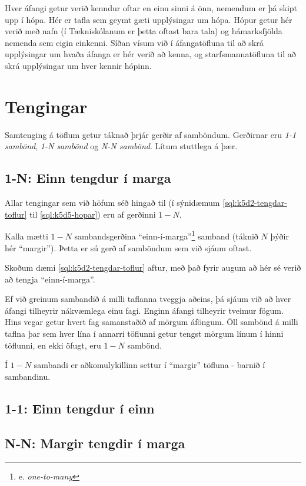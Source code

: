 \begin{example}
\caption[Hópar]{Hver áfangi getur verið kenndur oftar en einu sinni á önn, nemendum er þá skipt upp í hópa. Hér er tafla sem geymt gæti upplýsingar um hópa. Hópur getur hér verið með nafn (í Tækniskólanum er þetta oftast bara tala) og hámarksfjölda nemenda sem eigin einkenni. Síðan vísum við í áfangatöfluna til að skrá upplýsingar um hvaða áfanga er hér verið að kenna, og starfsmannatöfluna til að skrá upplýsingar um hver kennir hópinn.}
\label{sql:k5d5-hopar}
\centering
{}
\end{example}

\section{Tengingar} %
Samtenging á töflum getur táknað þrjár gerðir af samböndum. Gerðirnar eru \emph{1-1 sambönd}, \emph{1-N sambönd} og \emph{N-N sambönd}. Lítum stuttlega á þær.

\subsection{1-N: Einn tengdur í marga}
Allar tengingar sem við höfum séð hingað til (í sýnidæmum \ref{sql:k5d2-tengdar-toflur} til \ref{sql:k5d5-hopar}) eru af gerðinni $1-N$.

Kalla mætti $1-N$ sambandsgerðina ``einn-í-marga''\footnote{e. \emph{one-to-many}} samband (táknið $N$ þýðir hér ``margir''). Þetta er sú gerð af samböndum sem við sjáum oftast.

Skoðum dæmi \ref{sql:k5d2-tengdar-toflur} aftur, með það fyrir augum að hér sé verið að tengja ``einn-í-marga''.

Ef við greinum sambandið á milli taflanna tveggja aðeins, þá sjáum við að hver áfangi tilheyrir nákvæmlega einu fagi. Enginn áfangi tilheyrir tveimur fögum. Hins vegar getur hvert fag samanstaðið af mörgum áföngum. Öll sambönd á milli taflna þar sem hver lína í annarri töflunni getur tengst mörgum línum í hinni töflunni, en ekki öfugt, eru $1-N$ sambönd.

Í $1-N$ sambandi er aðkomulykillinn settur í ``margir'' töfluna - barnið í sambandinu.
\subsection{1-1: Einn tengdur í einn}
\subsection{N-N: Margir tengdir í marga}
